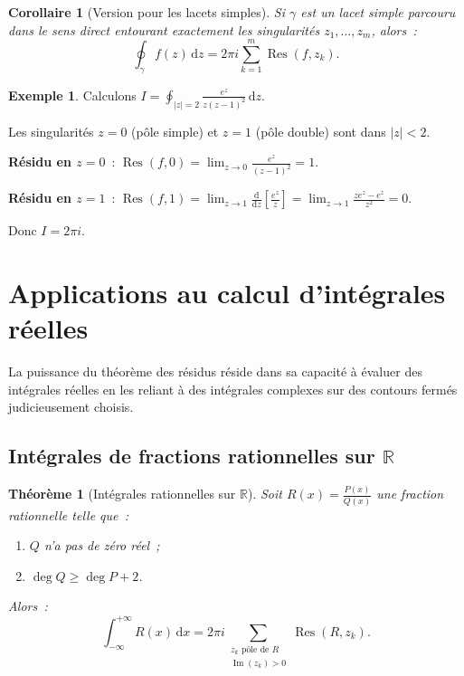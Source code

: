 \documentclass[12pt,a4paper,openany]{book}
\theoremstyle{definition}
\newtheorem{exemple}[definition]{Exemple}
\theoremstyle{plain}
\newtheorem{theoreme}[definition]{Théorème}
\newtheorem{corollaire}[definition]{Corollaire}
\theoremstyle{remark}
\newcommand{\R}{\mathbb{R}}
\DeclareMathOperator{\im}{Im}
\DeclareMathOperator{\Res}{Res}
\newcommand{\dd}{\mathrm{d}}
\newcommand{\abs}[1]{\left|#1\right|}
\begin{document}
\begin{corollaire}[Version pour les lacets simples]\label{cor:residus-lacet-simple}
Si $\gamma$ est un lacet simple parcouru dans le sens direct entourant exactement
les singularités $z_1, \ldots, z_m$, alors~:
\[
  \oint_{\gamma} f(z)\, \dd z = 2\pi i \sum_{k=1}^{m} \Res(f, z_k).
\]
\end{corollaire}

\begin{exemple}\label{ex:application-residus-1}
Calculons $I = \oint_{\abs{z}=2} \frac{e^z}{z(z-1)^2}\, \dd z$.

Les singularités $z = 0$ (pôle simple) et $z = 1$ (pôle double) sont dans $\abs{z}<2$.

\textbf{Résidu en $z = 0$}~:
$\Res(f, 0) = \lim_{z \to 0} \frac{e^z}{(z-1)^2} = 1$.

\textbf{Résidu en $z = 1$}~:
$\Res(f, 1) = \lim_{z \to 1} \frac{\dd}{\dd z}\!\left[\frac{e^z}{z}\right]
= \lim_{z \to 1} \frac{ze^z - e^z}{z^2} = 0$.

Donc $I = 2\pi i$.
\end{exemple}

\section{Applications au calcul d'intégrales réelles}\label{sec:integrales-reelles}

La puissance du théorème des résidus réside dans sa capacité à évaluer des intégrales
réelles en les reliant à des intégrales complexes sur des contours fermés
judicieusement choisis.

\subsection{Intégrales de fractions rationnelles sur $\R$}\label{subsec:int-rationnelles}

\begin{theoreme}[Intégrales rationnelles sur $\R$]\label{thm:int-rationnelle}
Soit $R(x) = \frac{P(x)}{Q(x)}$ une fraction rationnelle telle que~:
\begin{enumerate}[label=(\roman*)]
  \item $Q$ n'a pas de zéro réel~;
  \item $\deg Q \geq \deg P + 2$.
\end{enumerate}
Alors~:
\[
  \int_{-\infty}^{+\infty} R(x)\, \dd x
  = 2\pi i \sum_{\substack{z_k \text{ pôle de } R \\ \im(z_k) > 0}} \Res(R, z_k).
\]
\end{theoreme}
\end{document}
